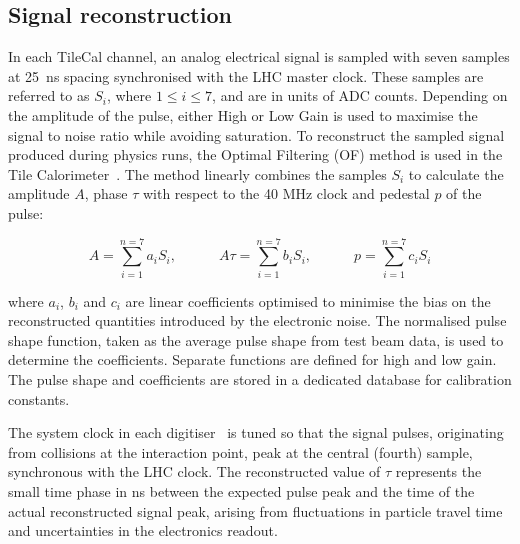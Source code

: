 \subsection{Signal reconstruction}
\label{sec:signal_energy_reco}

In each TileCal channel, an analog electrical signal is sampled with seven samples at 25~ns spacing synchronised with the LHC master clock. These samples are referred to as $S_i$, where $1\leq i \leq 7$, and are in units of ADC counts. Depending on the amplitude of the pulse, either High or Low Gain is used to maximise the signal to noise ratio while avoiding saturation. To reconstruct the sampled signal produced during physics runs, the Optimal Filtering (OF) method is used in the Tile Calorimeter~\cite{Cleland:2002rya, Fullana:816152}. The method linearly combines the samples $S_i$ to calculate the amplitude $A$, phase $\tau$ with respect to the 40 MHz clock and pedestal $p$ of the pulse:

\begin{equation}
A=\sum_{i=1}^{n=7}a_iS_i,\hspace{3em}
A\tau=\sum_{i=1}^{n=7}b_iS_i,\hspace{3em}
p=\sum_{i=1}^{n=7}c_iS_i
\label{eq:of}
\end{equation}

where $a_i$, $b_i$ and $c_i$ are linear coefficients optimised to minimise the bias on the reconstructed quantities introduced by the electronic noise. The normalised pulse shape function, taken as the average pulse shape from test beam data, is used to determine the coefficients. Separate functions are defined for high and low gain. The pulse shape and coefficients are stored in a dedicated database for calibration constants. 


The system clock in each digitiser~\cite{Berglund:2008zz} is tuned so that the signal pulses, originating from collisions at the interaction point, 
peak at the central (fourth) sample, synchronous with the LHC clock. The reconstructed value of $\tau$ represents the small time phase in ns between the expected pulse peak and the time of the actual reconstructed signal peak, arising from fluctuations in particle travel time and uncertainties in the electronics readout.

